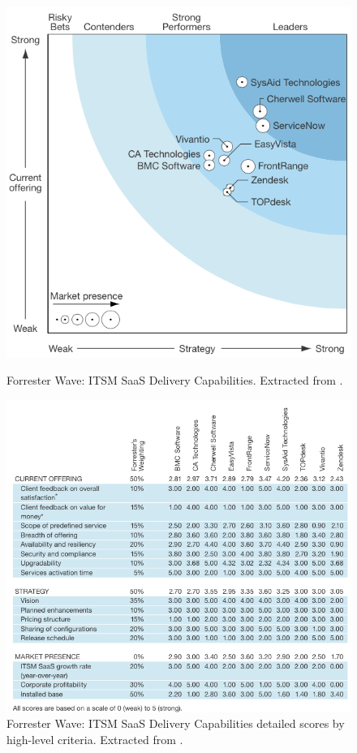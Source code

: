 \begin{figure}[h!]
\begin{minipage}[h]{0.40\linewidth}
\centering
\includegraphics[width=\textwidth]{img/ForresterWaveITSM.png}
\caption{Forrester Wave: ITSM SaaS Delivery Capabilities. Extracted from \cite{forresterWaveITSM}.}
\label{fig:figure1}
\end{minipage}
\hspace{0.5cm}
\begin{minipage}[h]{0.60\linewidth}
\centering
\includegraphics[width=\textwidth]{img/ITSMForrScores.png}
\caption{Forrester Wave: ITSM SaaS Delivery Capabilities detailed scores by high-level criteria. Extracted from \cite{forresterWaveITSM}.}
\label{fig:figure2}
\end{minipage}
\end{figure}

